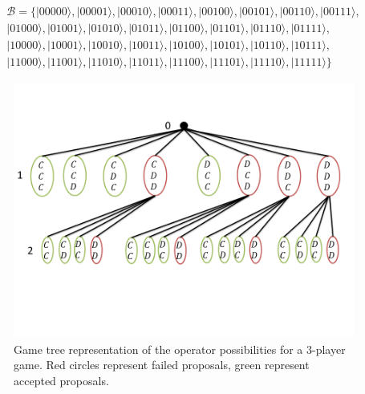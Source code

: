 \begin{equation}
\begin{split}
\mathcal{B}= \{ \vert 00000\rangle , \vert 00001\rangle , \vert 00010\rangle , \vert 00011\rangle , \vert 00100\rangle , \vert 00101\rangle , \vert 00110\rangle , \vert 00111\rangle, \\
 \vert 01000\rangle , \vert 01001\rangle , \vert 01010\rangle , \vert 01011\rangle , \vert 01100\rangle , \vert 01101\rangle , \vert 01110\rangle , \vert 01111\rangle, \\
 \vert 10000\rangle , \vert 10001\rangle , \vert 10010\rangle , \vert 10011\rangle , \vert 10100\rangle , \vert 10101\rangle , \vert 10110\rangle , \vert 10111\rangle, \\
 \vert 11000\rangle , \vert 11001\rangle , \vert 11010\rangle , \vert 11011\rangle , \vert 11100\rangle , \vert 11101\rangle , \vert 11110\rangle , \vert 11111\rangle \}
\end{split}
\label{putadevida}
\end{equation}



\begin{figure}[h]
\centering 
\includegraphics[scale=0.55]{Figures/architecture/GameTree/Slide1.png}
\caption{Game tree representation of the operator possibilities for a $3$-player game. Red circles represent failed proposals, green represent accepted proposals. }
\label{fig:pg_architecturegametree}
\end{figure}


